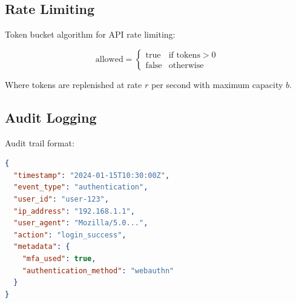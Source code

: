 \subsection{Rate Limiting}

Token bucket algorithm for API rate limiting:

\begin{equation}
    \text{allowed} = \begin{cases}
        \text{true} & \text{if } \text{tokens} > 0 \\
        \text{false} & \text{otherwise}
    \end{cases}
\end{equation}

Where tokens are replenished at rate $r$ per second with maximum capacity $b$.

\subsection{Audit Logging}

Audit trail format:

\begin{lstlisting}[language=json]
{
  "timestamp": "2024-01-15T10:30:00Z",
  "event_type": "authentication",
  "user_id": "user-123",
  "ip_address": "192.168.1.1",
  "user_agent": "Mozilla/5.0...",
  "action": "login_success",
  "metadata": {
    "mfa_used": true,
    "authentication_method": "webauthn"
  }
}
\end{lstlisting}

